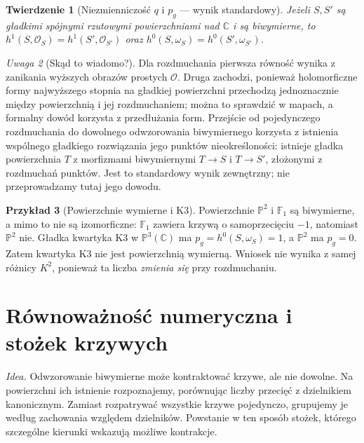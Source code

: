\documentclass[11pt,a4paper,openany]{report}
\numberwithin{equation}{section}
\theoremstyle{plain}
\newtheorem{twierdzenie}{Twierdzenie}[section]
\theoremstyle{definition}
\newtheorem{przyklad}[twierdzenie]{Przykład}
\theoremstyle{remark}
\newtheorem{uwaga}[twierdzenie]{Uwaga}
\newcommand{\C}{\mathbb C}
\newcommand{\PP}{\mathbb P}
\begin{document}
\begin{twierdzenie}[Niezmienniczość $q$ i $p_g$ — wynik standardowy]
\label{tw:ga8-q-pg}
Jeżeli $S,S'$ są gładkimi spójnymi rzutowymi
powierzchniami nad $\C$ i są biwymierne, to
$h^1(S,\mathcal O_S)=h^1(S',\mathcal O_{S'})$ oraz
$h^0(S,\omega_S)=h^0(S',\omega_{S'})$.
\end{twierdzenie}
\begin{uwaga}[Skąd to wiadomo?]
Dla rozdmuchania pierwsza równość wynika z zanikania
wyższych obrazów prostych $\mathcal O$.
Druga zachodzi, ponieważ holomorficzne formy
najwyższego stopnia na gładkiej powierzchni
przechodzą jednoznacznie między powierzchnią i jej
rozdmuchaniem; można to sprawdzić w mapach, a
formalny dowód korzysta z przedłużania form.
Przejście od pojedynczego rozdmuchania do dowolnego
odwzorowania biwymiernego korzysta z istnienia wspólnego
gładkiego rozwiązania jego punktów nieokreśloności:
istnieje gładka powierzchnia $T$ z morfizmami
biwymiernymi $T\to S$ i $T\to S'$, złożonymi
z rozdmuchań punktów. Jest to standardowy wynik
zewnętrzny; nie przeprowadzamy tutaj jego dowodu.
\end{uwaga}

\begin{przyklad}[Powierzchnie wymierne i K3]
Powierzchnie $\PP^2$ i $\mathbb F_1$ są biwymierne,
a mimo to nie są izomorficzne: $\mathbb F_1$ zawiera
krzywą o samoprzecięciu $-1$, natomiast $\PP^2$ nie.
Gładka kwartyka K3 w $\PP^3(\C)$ ma
$p_g=h^0(S,\omega_S)=1$, a $\PP^2$ ma $p_g=0$.
Zatem kwartyka K3 nie jest powierzchnią wymierną.
Wniosek nie wynika z samej różnicy $K^2$, ponieważ
ta liczba \emph{zmienia się} przy rozdmuchaniu.
\end{przyklad}

\section{Równoważność numeryczna i stożek krzywych}
\label{sec:ga8-ne-cone}

\emph{Idea.} Odwzorowanie biwymierne może kontraktować krzywe,
ale nie dowolne. Na powierzchni ich istnienie rozpoznajemy,
porównując liczby przecięć z dzielnikiem kanonicznym.
Zamiast rozpatrywać wszystkie krzywe pojedynczo, grupujemy je
według zachowania względem dzielników. Powstanie w ten sposób
stożek, którego szczególne kierunki wskazują możliwe kontrakcje.
\end{document}
